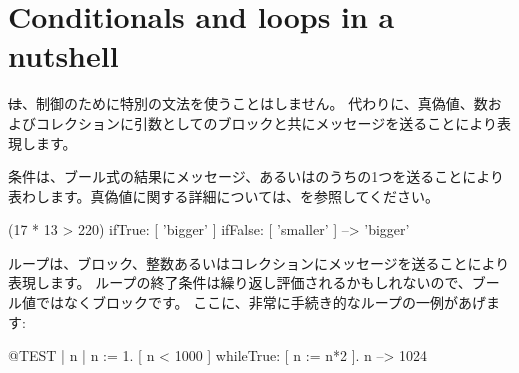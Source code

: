 \documentclass[a4paper,10pt,twoside]{book}
\begin{document}





\section{Conditionals and loops in a nutshell}

\st は、制御のために特別の文法を使うことはしません。
代わりに、真偽値、数およびコレクションに引数としてのブロックと共にメッセージを送ることにより表現します。

条件は、ブール式の結果にメッセージ、あるいはのうちの1つを送ることにより表わします。真偽値に関する詳細については、を参照してください。

\begin{code}{}
(17 * 13 > 220)
   ifTrue: [ 'bigger' ]
   ifFalse: [ 'smaller' ] --> 'bigger'
\end{code}

ループは、ブロック、整数あるいはコレクションにメッセージを送ることにより表現します。
ループの終了条件は繰り返し評価されるかもしれないので、ブール値ではなくブロックです。
ここに、非常に手続き的なループの一例があげます:

\begin{code}{@TEST | n |}
n := 1.
[ n < 1000 ] whileTrue: [ n := n*2 ].
n --> 1024
\end{code}
\end{document}
